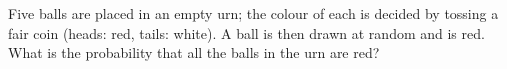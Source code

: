 Five balls are placed in an empty urn; the colour of each is decided by tossing a fair coin (heads: red, tails: white). A ball is then drawn at random and is red. What is the probability that all the balls in the urn are red?
